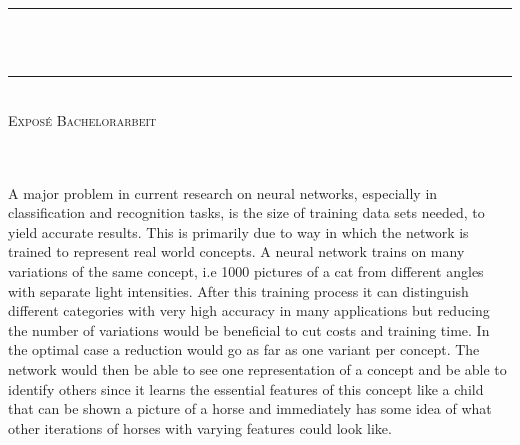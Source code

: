 \begin{titlepage}

	
\begin{center}
  



\newcommand{\HRule}{\rule{\linewidth}{0.5mm}}
\HRule \\[0.4cm]
\vspace{0.4cm}
{\large \bfseries \titel}\\[0.4cm]

\HRule \\[0.5cm]

\textsc{\large Exposé Bachelorarbeit}\\[0.3cm]

\vorname \space \textsc {\name}  \\ 

\matrikelnr\\
[1.5cm]

\end{center}

A major problem in current research on neural networks, especially in classification and recognition tasks, is the size of training data sets needed, to yield accurate results. This is primarily due to way in which the network is trained to represent real world concepts. A neural network trains on many variations of the same concept, i.e 1000 pictures of a cat from different angles with separate light intensities. After this training process it can distinguish different categories with very high accuracy in many applications but reducing the number of variations would be beneficial to cut costs and training time. In the optimal case a reduction would go as far as one variant per concept. The network would then be able to see one representation of a concept and be able to identify others since it learns the essential features of this concept like a child that can be shown a picture of a horse and immediately has some idea of what other iterations of horses with varying features could look like.  


\end{titlepage}
